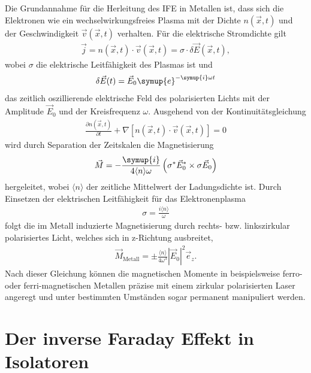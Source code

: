Die Grundannahme für die Herleitung des IFE in Metallen ist, dass sich die Elektronen wie ein wechselwirkungsfreies Plasma mit der
Dichte $n(\vec{x},t)$ und der Geschwindigkeit $\vec{v}(\vec{x},t)$ verhalten. Für die elektrische Stromdichte gilt
\begin{align}
  \vec{j} = n(\vec{x},t) \cdot \vec{v}(\vec{x},t) = \sigma \cdot \delta \vec{E}(\vec{x},t),
\end{align}
wobei $\sigma$ die elektrische Leitfähigkeit des Plasmas ist und
\begin{align}
  \delta \vec{E}(t) = \vec{E}_0 \symup{e}^{-\symup{i}\omega t}
\end{align}
das zeitlich oszillierende elektrische Feld des polarisierten Lichts mit der Amplitude $\vec{E}_0$ und der Kreisfrequenz $\omega$.
Ausgehend von der Kontinuitätsgleichung
\begin{align}
  \frac{\partial n(\vec{x},t)}{\partial t} + \nabla \left[n(\vec{x},t) \cdot \vec{v}(\vec{x},t)\right] = 0
\end{align}
wird durch Separation der Zeitskalen die Magnetisierung
\begin{align}
  \vec{M} = -\frac{\symup{i}}{4 \langle n \rangle \omega} \left( \sigma^* \vec{E}_0^* \times \sigma \vec{E}_0 \right)
  \label{eqn:magnetisierung}
\end{align}
hergeleitet, wobei $\langle n \rangle$ der zeitliche Mittelwert der Ladungsdichte ist. Durch Einsetzen der elektrischen
Leitfähigkeit für das Elektronenplasma
\begin{align}
  \sigma = \frac{i \langle n \rangle}{\omega}
\end{align}
folgt die im Metall induzierte Magnetisierung durch rechts- bzw. linkszirkular polarisiertes Licht, welches sich in z-Richtung ausbreitet,
\begin{align}
  \vec{M}_\text{Metall} = \pm \frac{\langle n \rangle}{4 \omega^3} \left| \vec{E}_0 \right|^2 \vec{e}_z.
  \label{eqn:metmag}
\end{align}
Nach dieser Gleichung können die magnetischen Momente in beispielsweise ferro- oder ferri-magnetischen Metallen präzise
mit einem zirkular polarisierten Laser angeregt und unter bestimmten Umständen sogar permanent manipuliert werden. \cite{hertel}

\section{Der inverse Faraday Effekt in Isolatoren}
\label{sec:ifeiso}

